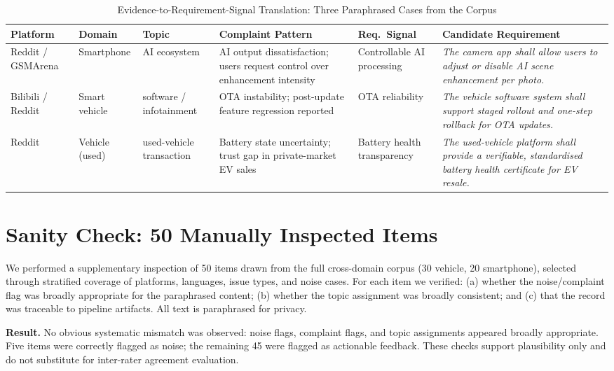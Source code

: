 \documentclass[conference]{IEEEtran}
\begin{document}
\begin{table}[t]
\caption{Evidence-to-Requirement-Signal Translation: Three Paraphrased Cases from the Corpus}
\label{tab:examples}
\centering\small\setlength{\tabcolsep}{4pt}
\begin{tabularx}{\textwidth}{p{1.6cm} p{1.4cm} p{1.9cm} p{2.8cm} p{2.0cm} p{4.5cm}}
\toprule
Platform & Domain & Topic & Complaint Pattern & Req.\ Signal & Candidate Requirement \\
\midrule
Reddit / GSMArena
  & Smartphone
  & AI ecosystem
  & AI output dissatisfaction; users request control over enhancement intensity
  & Controllable AI processing
  & \textit{The camera app shall allow users to adjust or disable AI scene enhancement per photo.} \\
\addlinespace
Bilibili / Reddit
  & Smart vehicle
  & software / infotainment
  & OTA instability; post-update feature regression reported
  & OTA reliability
  & \textit{The vehicle software system shall support staged rollout and one-step rollback for OTA updates.} \\
\addlinespace
Reddit
  & Vehicle (used)
  & used-vehicle transaction
  & Battery state uncertainty; trust gap in private-market EV sales
  & Battery health transparency
  & \textit{The used-vehicle platform shall provide a verifiable, standardised battery health certificate for EV resale.} \\
\bottomrule
\end{tabularx}
\end{table}

\section{Sanity Check: 50 Manually Inspected Items}

We performed a supplementary inspection of 50 items drawn from the full cross-domain corpus (30 vehicle, 20 smartphone), selected through stratified coverage of platforms, languages, issue types, and noise cases. For each item we verified: (a) whether the noise/complaint flag was broadly appropriate for the paraphrased content; (b) whether the topic assignment was broadly consistent; and (c) that the record was traceable to pipeline artifacts. All text is paraphrased for privacy.

\textbf{Result.} No obvious systematic mismatch was observed: noise flags, complaint flags, and topic assignments appeared broadly appropriate. Five items were correctly flagged as noise; the remaining 45 were flagged as actionable feedback. These checks support plausibility only and do not substitute for inter-rater agreement evaluation.
\end{document}
